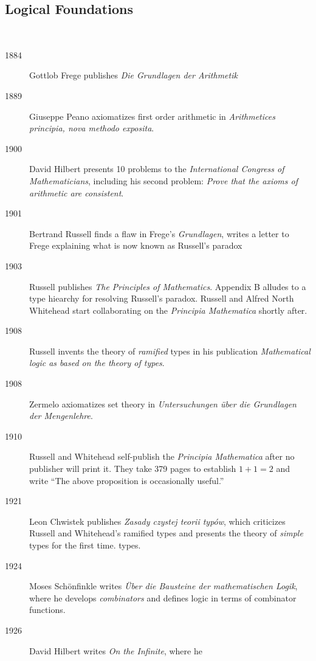 \documentclass{beamer}
\begin{document}
\subsection{Logical Foundations}
\begin{frame}[allowframebreaks]{\insertsectionhead\ \textemdash\
    \insertsubsectionhead}
  \begin{description}
  \item[1884] Gottlob Frege publishes \emph{Die Grundlagen der
      Arithmetik}
  \item[1889] Giuseppe Peano axiomatizes first order arithmetic in \emph{Arithmetices principia, nova methodo exposita}.
  \item[1900] David Hilbert presents 10 problems to the
    \emph{International Congress of Mathematicians}, including his
    second problem: \emph{Prove that the axioms of arithmetic are
      consistent}.
  \item[1901] Bertrand Russell finds a flaw in Frege's
    \emph{Grundlagen}, writes a letter to Frege explaining what is now
    known as Russell's paradox
  \item[1903] Russell publishes \emph{The Principles of
      Mathematics}. Appendix B alludes to a type hiearchy for
    resolving Russell's paradox.  Russell and Alfred North Whitehead
    start collaborating on the \emph{Principia Mathematica} shortly
    after.
  \item[1908] Russell invents the theory of \emph{ramified} types in
    his publication \emph{Mathematical logic as based on the theory of
      types}.
  \item[1908] Zermelo axiomatizes set theory in \emph{Untersuchungen
      \"uber die Grundlagen der Mengenlehre}.
  \item[1910] Russell and Whitehead self-publish the \emph{Principia
      Mathematica} after no publisher will print it. They take 379
    pages to establish $1 + 1 = 2$ and write ``The above proposition
    is occasionally useful.''
  \item[1921] Leon Chwistek publishes \emph{Zasady czystej teorii
      typów}, which criticizes Russell and Whitehead's ramified types
    and presents the theory of \emph{simple} types for the first time.
    types.
  \item[1924] Moses Sch\"onfinkle writes \emph{\"Uber die Bausteine
      der mathematischen Logik}, where he develops \emph{combinators}
    and defines logic in terms of combinator functions.
  \item[1926] David Hilbert writes \emph{On the Infinite}, where he

\end{description}
\end{frame}
\end{document}
